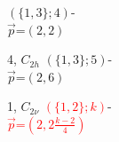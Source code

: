 \documentclass{beamer}
\begin{document}
\begin{frame}
\begin{center}
\begin{minipage}{19mm}
$(\{1, 3\};4)$-\\
$\vec{p}$=$(2,2)$
\end{minipage}
\hspace{3mm}
\begin{minipage}{19mm}
\centering
{}\par
4, $C_{2h}$
$(\{1, 3\};5)$-\\
$\vec{p}$=$(2,6)$
\end{minipage}
\begin{minipage}{19mm}\centering
{}\par
1, $C_{2\nu}$
\textcolor{red}{$(\{1, 2\};k)$}-\\
\textcolor{red}{$\vec{p}$=$(2,2\frac{k-2}{4})$}
\end{minipage}
\end{center}









\end{frame}
\end{document}
